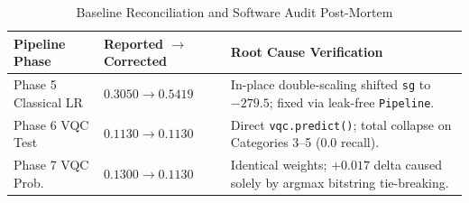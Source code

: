 \documentclass[10pt,conference]{IEEEtran}
\begin{document}
\begin{table}[htbp]
\centering
\caption{Baseline Reconciliation and Software Audit Post-Mortem}
\label{tab:bug_reconciliation}
\renewcommand{\arraystretch}{0.90}
\begin{tabularx}{\columnwidth}{lXX}
\toprule
\textbf{Pipeline Phase} & \textbf{Reported $\to$ Corrected} & \textbf{Root Cause Verification} \\
\midrule
Phase 5 Classical LR & $0.3050 \to \mathbf{0.5419}$ & In-place double-scaling shifted \texttt{sg} to $-279.5$; fixed via leak-free \texttt{Pipeline}. \\
Phase 6 VQC Test & $0.1130 \to \mathbf{0.1130}$ & Direct \texttt{vqc.predict()}; total collapse on Categories 3--5 (0.0 recall). \\
Phase 7 VQC Prob. & $0.1300 \to \mathbf{0.1130}$ & Identical weights; $+0.017$ delta caused solely by argmax bitstring tie-breaking. \\
\bottomrule
\end{tabularx}
\end{table}
\end{document}
